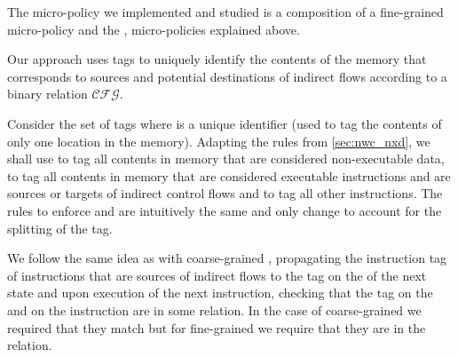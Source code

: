 The micro-policy we implemented and studied is a composition of a fine-grained
\CFI micro-policy and the \NWC, \NXDname micro-policies explained above.

Our approach uses tags to uniquely identify the contents of the memory that 
corresponds to sources and potential destinations of indirect flows according to
a binary relation $\mathcal{CFG}$.

Consider the set of tags 
 where  is a unique identifier 
(\IE used to tag the contents of only one location in the memory). 
Adapting the rules from \ref{sec:nwc_nxd}, we shall use \DATAname to tag all 
contents in memory that are considered non-executable data, 
to tag all contents in memory that are considered executable instructions and 
are sources or targets of indirect control flows and \INSTR{$\bot$} to tag all
other instructions.
The rules to enforce \NWCname and \NXDname are intuitively the same and only
change to account for the splitting of the \INSTRname tag.

We follow the same idea as with coarse-grained \CFI, propagating the instruction
tag of instructions that are sources of indirect flows to the tag on the \pc of
the next state and upon execution of the next instruction, checking that the tag
on the \pc and on the instruction are in some relation. In the case of
coarse-grained \CFI we required that they match but for fine-grained \CFI we
require that they are in the \CFG relation.


